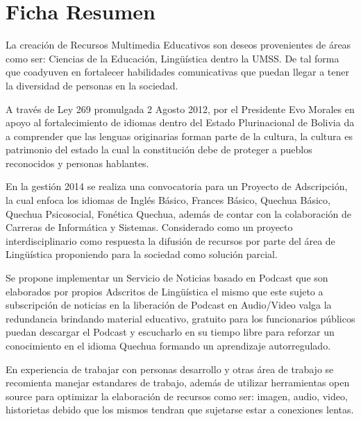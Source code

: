 \cleardoublepage
\hypertarget{Ficha Resumen}{}

\chapter*{Ficha Resumen}

La creación de Recursos Multimedia Educativos son deseos provenientes de 
\'{a}reas como ser: Ciencias de la Educaci\'{o}n, Ling\"{u}\'{i}stica dentro la
UMSS.
De tal forma que coadyuven en fortalecer habilidades comunicativas que puedan 
llegar a tener la diversidad de personas en la sociedad.

A trav\'{e}s de Ley 269 promulgada 2 Agosto 2012, por el Presidente Evo Morales
en apoyo al fortalecimiento de idiomas dentro del Estado Plurinacional de 
Bolivia da a comprender que las lenguas originarias forman parte de la cultura,
la cultura es patrimonio del estado la cual la constitución debe de proteger a
pueblos reconocidos y personas hablantes.

En la gesti\'{o}n 2014 se realiza una convocatoria para un Proyecto de 
Adscripci\'{o}n, la cual enfoca los idiomas de Ingl\'{e}s B\'{a}sico, Frances
B\'{a}sico, Quechua B\'{a}sico, Quechua Psicosocial, Fon\'{e}tica Quechua, 
adem\'{a}s de contar con la colaboraci\'{o}n de Carreras de Inform\'{a}tica y
Sistemas. Considerado como un proyecto interdisciplinario como respuesta la
difusi\'{o}n de recursos por parte del \'{a}rea de Ling\"{u}\'{i}stica 
proponiendo para la sociedad como soluci\'{o}n parcial.

Se propone implementar un Servicio de Noticias basado en Podcast que son 
elaborados por propios Adscritos de Ling\"{u}\'{i}stica el mismo que este sujeto
a subscripci\'{o}n de noticias en la liberaci\'{o}n de Podcast en Audio/Video 
valga la redundancia brindando material educativo, gratuito para los funcionarios
p\'{u}blicos puedan descargar el Podcast y escucharlo en su tiempo libre para 
reforzar un conocimiento en el idioma Quechua formando un aprendizaje 
autorregulado.

En experiencia de trabajar con personas desarrollo y otras \'{a}rea de trabajo 
se recomienta manejar estandares de trabajo, adem\'{a}s de utilizar herramientas
open source para optimizar la elaboraci\'{o}n de recursos como ser: imagen, audio,
video, historietas debido que los mismos tendran que sujetarse estar a conexiones
lentas.